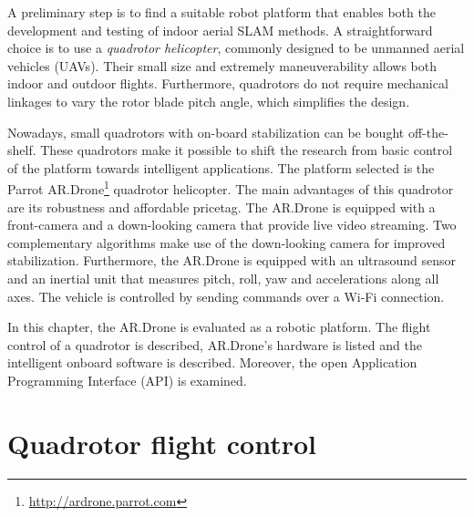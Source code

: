 A preliminary step is to find a suitable robot platform that enables both the development and testing of indoor aerial SLAM methods.
A straightforward choice is to use a \textit{quadrotor helicopter}, commonly designed to be unmanned aerial vehicles (UAVs).
Their small size and extremely maneuverability allows both indoor and outdoor flights.
Furthermore, quadrotors do not require mechanical linkages to vary the rotor blade pitch angle, which simplifies the design.

Nowadays, small quadrotors with on-board stabilization can be bought off-the-shelf.
These quadrotors make it possible to shift the research from basic control of the platform towards intelligent applications.
The platform selected is the Parrot AR.Drone\footnote{\url{http://ardrone.parrot.com}} quadrotor helicopter.
The main advantages of this quadrotor are its robustness and affordable pricetag.
The AR.Drone is equipped with a front-camera and a down-looking camera that provide live video streaming.
Two complementary algorithms make use of the down-looking camera for improved stabilization.
Furthermore, the AR.Drone is equipped with an ultrasound sensor and an inertial unit that measures pitch, roll, yaw and accelerations along all axes.
The vehicle is controlled by sending commands over a Wi-Fi connection.

In this chapter, the AR.Drone is evaluated as a robotic platform.
The flight control of a quadrotor is described, AR.Drone's hardware is listed and the intelligent onboard software is described.
Moreover, the open Application Programming Interface (API) is examined.


\section{Quadrotor flight control}
\label{sec:platform-quadrotor-flight-control}


